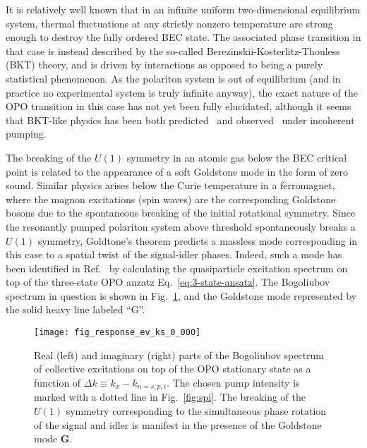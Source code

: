 It is relatively well known that in an infinite uniform
two-dimensional equilibrium system, thermal fluctuations at any
strictly nonzero temperature are strong enough to destroy the fully
ordered BEC state. The associated phase transition in that case is
instead described by the so-called Berezinskii-Kosterlitz-Thouless
(BKT) theory, and is driven by interactions as opposed to being a
purely statistical phenomenon. As the polariton system is out of
equilibrium (and in practice no experimental system is truly infinite
anyway), the exact nature of the OPO transition in this case has not
yet been fully elucidated, although it seems that BKT-like physics has
been both predicted~\cite{Szyma_ska_2006} and
observed~\cite{Roumpos2012} under incoherent pumping.

The breaking of the $U(1)$ symmetry in an atomic gas below the BEC
critical point is related to the appearance of a soft Goldstone mode
in the form of zero sound. Similar physics arises below the Curie
temperature in a ferromagnet, where the magnon excitations (spin
waves) are the corresponding Goldstone bosons due to the spontaneous
breaking of the initial rotational symmetry. Since the resonantly
pumped polariton system above threshold spontaneously breaks a $U(1)$
symmetry, Goldtone's theorem predicts a massless mode corresponding in
this case to a spatial twist of the signal-idler phases. Indeed, such
a mode has been identified in Ref.~\cite{Wouters_2007} by calculating
the quasiparticle excitation spectrum on top of the three-state OPO
anzatz Eq.~\eqref{eq:3-state-ansatz}. The Bogoliubov spectrum in
question is shown in Fig.~\ref{fig:goldstone}, and the Goldstone mode
represented by the solid heavy line labeled ``G''.
%
\begin{figure}[tb]\centering
  \texttt{[image: fig\_response\_ev\_ks\_0\_000]}
  \caption{
    Real (left) and imaginary (right) parts of the Bogoliubov spectrum
    of collective excitations on top of the OPO stationary state as a
    function of $\Delta k \equiv k_x - k_{n=s,p,i}$. The chosen pump intensity is
    marked with a dotted line in Fig.~\ref{fig:spi}. The breaking of the
    $U(1)$ symmetry corresponding to the simultaneous phase rotation of
    the signal and idler is manifest in the presence of the Goldstone mode
    \textbf{G}.
  }\label{fig:goldstone}
\end{figure}
%
\afterpage{\clearpage}

